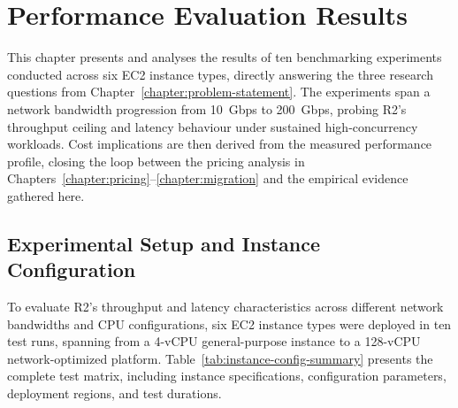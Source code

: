 
\chapter{Performance Evaluation Results}\label{chapter:results}

This chapter presents and analyses the results of ten benchmarking experiments conducted across six EC2 instance types, directly answering the three research questions from Chapter~\ref{chapter:problem-statement}. The experiments span a network bandwidth progression from 10~Gbps to 200~Gbps, probing R2's throughput ceiling and latency behaviour under sustained high-concurrency workloads. Cost implications are then derived from the measured performance profile, closing the loop between the pricing analysis in Chapters~\ref{chapter:pricing}--\ref{chapter:migration} and the empirical evidence gathered here.

\section{Experimental Setup and Instance Configuration}\label{sec:experimental-setup}

To evaluate R2's throughput and latency characteristics across different network bandwidths and CPU configurations, six EC2 instance types were deployed in ten test runs, spanning from a 4-vCPU general-purpose instance to a 128-vCPU network-optimized platform. Table~\ref{tab:instance-config-summary} presents the complete test matrix, including instance specifications, configuration parameters, deployment regions, and test durations.

